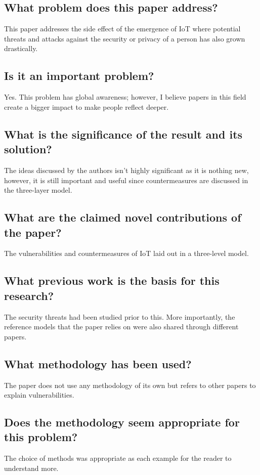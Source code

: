 \documentclass[11pt,a4paper]{article}
\begin{document}
\subsection*{What problem does this paper address?}
This paper addresses the side effect of the emergence of IoT where potential threats and attacks against the security or privacy of a person has also grown drastically. 

\subsection*{Is it an important problem?}
Yes. This problem has global awareness; however, I believe papers in this field create a bigger impact to make people reflect deeper. 

\subsection*{What is the significance of the result and its solution?}
The ideas discussed by the authors isn’t highly significant as it is nothing new, however, it is still important and useful since countermeasures are discussed in the three-layer model. 

\subsection*{What are the claimed novel contributions of the paper?}
The vulnerabilities and countermeasures of IoT laid out in a three-level model. 

\subsection*{What previous work is the basis for this research?}
The security threats had been studied prior to this. More importantly, the reference models that the paper relies on were also shared through different papers. 

\subsection*{What methodology has been used?}
The paper does not use any methodology of its own but refers to other papers to explain vulnerabilities. 

\subsection*{Does the methodology seem appropriate for this problem?}
The choice of methods was appropriate as each example for the reader to understand more. 
\end{document}
